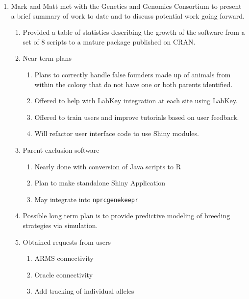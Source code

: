 \documentclass[
]{article}
\providecommand{\tightlist}{%
  \setlength{\itemsep}{0pt}\setlength{\parskip}{0pt}}
\begin{document}
\begin{enumerate}
\def\labelenumi{\arabic{enumi}.}
\tightlist
\item
  Mark and Matt met with the Genetics and Genomics Consortium to present
  a brief summary of work to date and to discuss potential work going
  forward.

  \begin{enumerate}
  \def\labelenumii{\arabic{enumii}.}
  \tightlist
  \item
    Provided a table of statistics describing the growth of the software
    from a set of 8 scripts to a mature package published on CRAN.
  \item
    Near term plans

    \begin{enumerate}
    \def\labelenumiii{\arabic{enumiii}.}
    \tightlist
    \item
      Plans to correctly handle false founders made up of animals from
      within the colony that do not have one or both parents identified.
    \item
      Offered to help with LabKey integration at each site using LabKey.
    \item
      Offered to train users and improve tutorials based on user
      feedback.
    \item
      Will refactor user interface code to use Shiny modules.
    \end{enumerate}
  \item
    Parent exclusion software

    \begin{enumerate}
    \def\labelenumiii{\arabic{enumiii}.}
    \tightlist
    \item
      Nearly done with conversion of Java scripts to R
    \item
      Plan to make standalone Shiny Application
    \item
      May integrate into \texttt{nprcgenekeepr}
    \end{enumerate}
  \item
    Possible long term plan is to provide predictive modeling of
    breeding strategies via simulation.
  \item
    Obtained requests from users

    \begin{enumerate}
    \def\labelenumiii{\arabic{enumiii}.}
    \tightlist
    \item
      ARMS connectivity
    \item
      Oracle connectivity
    \item
      Add tracking of individual alleles


\end{enumerate}
\end{enumerate}
\end{enumerate}
\end{document}
